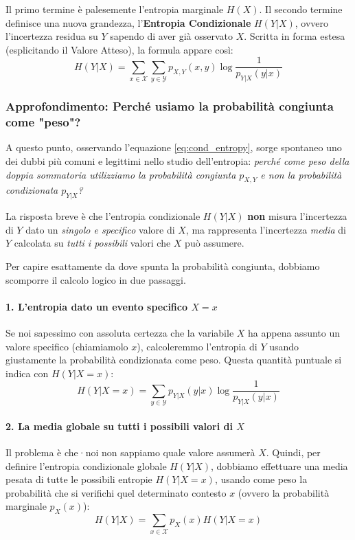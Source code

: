Il primo termine è palesemente l'entropia marginale $H(X)$. 
Il secondo termine definisce una nuova grandezza, l'\textbf{Entropia Condizionale} $H(Y|X)$, ovvero l'incertezza residua su $Y$ sapendo di aver già osservato $X$. 
Scritta in forma estesa (esplicitando il Valore Atteso), la formula appare così:
\begin{equation}
\label{eq:cond_entropy}
H(Y|X) = \sum_{x \in \mathcal{X}} \sum_{y \in \mathcal{Y}} p_{X,Y}(x,y) \log \frac{1}{p_{Y|X}(y|x)}
\end{equation}

\subsubsection*{Approfondimento: Perché usiamo la probabilità congiunta come "peso"?}

A questo punto, osservando l'equazione \ref{eq:cond_entropy}, sorge spontaneo uno dei dubbi più comuni e legittimi nello studio dell'entropia: \textit{perché come peso della doppia sommatoria utilizziamo la probabilità congiunta $p_{X,Y}$ e non la probabilità condizionata $p_{Y|X}$?}

La risposta breve è che l'entropia condizionale $H(Y|X)$ \textbf{non} misura l'incertezza di $Y$ dato un \textit{singolo e specifico} valore di $X$, ma rappresenta l'incertezza \textit{media} di $Y$ calcolata su \textit{tutti i possibili} valori che $X$ può assumere.

Per capire esattamente da dove spunta la probabilità congiunta, dobbiamo scomporre il calcolo logico in due passaggi.

\paragraph{1. L'entropia dato un evento specifico $X=x$}
Se noi sapessimo con assoluta certezza che la variabile $X$ ha appena assunto un valore specifico (chiamiamolo $x$), calcoleremmo l'entropia di $Y$ usando giustamente la probabilità condizionata come peso. Questa quantità puntuale si indica con $H(Y|X=x)$:
\begin{equation}
H(Y|X=x) = \sum_{y \in \mathcal{Y}} p_{Y|X}(y|x) \log \frac{1}{p_{Y|X}(y|x)}
\end{equation}

\paragraph{2. La media globale su tutti i possibili valori di $X$}
Il problema è che·noi non sappiamo quale valore assumerà $X$. Quindi, per definire l'entropia condizionale globale $H(Y|X)$, dobbiamo effettuare una media pesata di tutte le possibili entropie $H(Y|X=x)$, usando come peso la probabilità che si verifichi quel determinato contesto $x$ (ovvero la probabilità marginale $p_X(x)$):
\begin{equation}
H(Y|X) = \sum_{x \in \mathcal{X}} p_X(x) H(Y|X=x)
\end{equation}

